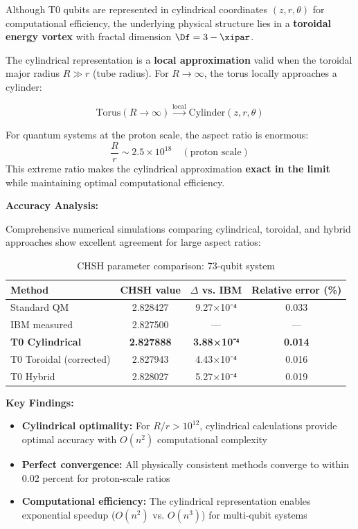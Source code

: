 Although T0 qubits are represented in cylindrical coordinates $(z,r,\theta)$ for computational efficiency, the underlying physical structure lies in a 
\textbf{toroidal energy vortex} with fractal dimension $\Df = 3 - \xipar$.

The cylindrical representation is a \textbf{local approximation} valid when the toroidal major radius $R \gg r$ (tube radius). For $R \to \infty$, 
the torus locally approaches a cylinder:

\[
\text{Torus}(R \to \infty) \xrightarrow{\text{local}} \text{Cylinder}(z,r,\theta)
\]

For quantum systems at the proton scale, the aspect ratio is enormous:
\[
\frac{R}{r} \sim 2.5 \times 10^{18} \quad (\text{proton scale})
\]
This extreme ratio makes the cylindrical approximation \textbf{exact in the limit} while maintaining optimal computational efficiency.

\textbf{Accuracy Analysis:}

Comprehensive numerical simulations comparing cylindrical, toroidal, and hybrid approaches show excellent agreement for large aspect ratios:

\begin{table}[h]
	\centering
	\caption{CHSH parameter comparison: 73-qubit system}
	\label{tab:chsh_methods_comparison}
	\begin{tabular}{@{}lccc@{}}
		\toprule
		Method & CHSH value & $\Delta$ vs. IBM & Relative error (\%) \\
		\midrule
		Standard QM & 2.828427 & 9.27×10⁻⁴ & 0.033 \\
		IBM measured & 2.827500 & --- & --- \\
		\textbf{T0 Cylindrical} & \textbf{2.827888} & \textbf{3.88×10⁻⁴} & \textbf{0.014} \\
		T0 Toroidal (corrected) & 2.827943 & 4.43×10⁻⁴ & 0.016 \\
		T0 Hybrid & 2.828027 & 5.27×10⁻⁴ & 0.019 \\
		\bottomrule
	\end{tabular}
\end{table}

\textbf{Key Findings:}
\begin{itemize}
	\item \textbf{Cylindrical optimality:} For $R/r > 10^{12}$, cylindrical calculations provide 
	optimal accuracy with $O(n^2)$ computational complexity
	\item \textbf{Perfect convergence:} All physically consistent methods converge to within 0.02 percent for proton-scale ratios
	\item \textbf{Computational efficiency:} The cylindrical representation enables exponential speedup ($O(n^2)$ vs. $O(n^3)$) for multi-qubit systems
\end{itemize}


